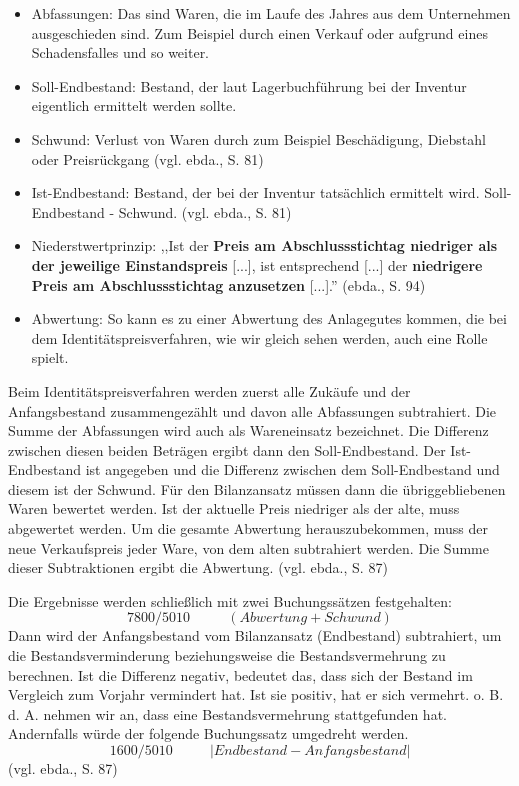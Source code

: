 \documentclass[12pt]{report}
\begin{document}
\begin{itemize}
	\item Abfassungen: Das sind Waren, die im Laufe des Jahres aus dem Unternehmen ausgeschieden sind. Zum Beispiel durch einen Verkauf oder aufgrund eines Schadensfalles und so weiter.
	\item Soll-Endbestand: Bestand, der laut Lagerbuchführung bei der Inventur eigentlich ermittelt werden sollte.
	\item Schwund: Verlust von Waren durch zum Beispiel Beschädigung, Diebstahl oder Preisrückgang (vgl. ebda., S. 81\nocite{RW4})
	\item Ist-Endbestand: Bestand, der bei der Inventur tatsächlich ermittelt wird. Soll-Endbestand - Schwund. (vgl. ebda., S. 81\nocite{RW4})
	\item Niederstwertprinzip: ,,Ist der \textbf{Preis am Abschlussstichtag niedriger als der jeweilige Einstandspreis} [...], ist entsprechend [...] der \textbf{niedrigere Preis am Abschlussstichtag anzusetzen} [...].'' (ebda., S. 94\nocite{RW4})
	\item Abwertung: So kann es zu einer Abwertung des Anlagegutes kommen, die bei dem Identitätspreisverfahren, wie wir gleich sehen werden, auch eine Rolle spielt.
\end{itemize}

\noindent Beim Identitätspreisverfahren werden zuerst alle Zukäufe und der Anfangsbestand zusammengezählt und davon alle Abfassungen subtrahiert. Die Summe der Abfassungen wird auch als Wareneinsatz bezeichnet. Die Differenz zwischen diesen beiden Beträgen ergibt dann den Soll-Endbestand. Der Ist-Endbestand ist angegeben und die Differenz zwischen dem Soll-Endbestand und diesem ist der Schwund. Für den Bilanzansatz müssen dann die übriggebliebenen Waren bewertet werden. Ist der aktuelle Preis niedriger als der alte, muss abgewertet werden. Um die gesamte Abwertung herauszubekommen, muss der neue Verkaufspreis jeder Ware, von dem alten subtrahiert werden. Die Summe dieser Subtraktionen ergibt die Abwertung. (vgl. ebda., S. 87\nocite{RW4})

\noindent Die Ergebnisse werden schließlich mit zwei Buchungssätzen festgehalten:
\[ 7800 / 5010\text{                                      }\text{                                      }\text{                                      }\text{                                      }(Abwertung + Schwund) \]
Dann wird der Anfangsbestand vom Bilanzansatz (Endbestand) subtrahiert, um die Bestandsverminderung beziehungsweise die Bestandsvermehrung zu berechnen. Ist die Differenz negativ, bedeutet das, dass sich der Bestand im Vergleich zum Vorjahr vermindert hat. Ist sie positiv, hat er sich vermehrt. o. B. d. A. nehmen wir an, dass eine Bestandsvermehrung stattgefunden hat. Andernfalls würde der folgende Buchungssatz umgedreht werden.
\[ 1600 / 5010\text{                                      }\text{                                      }\text{                                      }\text{                                      }|Endbestand - Anfangsbestand| \]  (vgl. ebda., S. 87\nocite{RW4})
\end{document}
